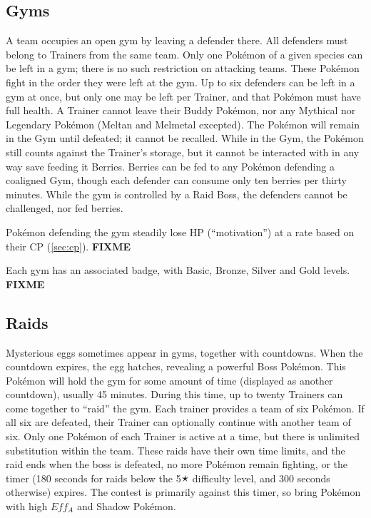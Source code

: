 \subsection{Gyms}
\label{sec:gyms}
A team occupies an open gym by leaving a defender there.
All defenders must belong to Trainers from the same team.
Only one Pokémon of a given species can be left in a gym; there is no
  such restriction on attacking teams.
These Pokémon fight in the order they were left at the gym.
Up to six defenders can be left in a gym at once, but only one
  may be left per Trainer, and that Pokémon must have full health.
A Trainer cannot leave their Buddy Pokémon, nor any Mythical nor Legendary
  Pokémon (Meltan and Melmetal excepted).
The Pokémon will remain in the Gym until defeated; it cannot be recalled.
While in the Gym, the Pokémon still counts against the Trainer's storage,
  but it cannot be interacted with in any way save feeding it Berries.
Berries can be fed to any Pokémon defending a coaligned Gym, though
  each defender can consume only ten berries per thirty minutes.
While the gym is controlled by a Raid Boss, the defenders cannot be challenged,
  nor fed berries.

Pokémon defending the gym steadily lose HP (``motivation'') at a rate
  based on their CP (\autoref{sec:cp}).
\textbf{FIXME}

Each gym has an associated badge, with Basic, Bronze, Silver and Gold levels.
\textbf{FIXME}

\subsection{Raids}
\label{sec:raids}
Mysterious eggs sometimes appear in gyms, together with countdowns.
When the countdown expires, the egg hatches, revealing a powerful Boss Pokémon.
This Pokémon will hold the gym for some amount of time (displayed as another countdown), usually 45 minutes.
During this time, up to twenty Trainers can come together to ``raid'' the gym.
Each trainer provides a team of six Pokémon.
If all six are defeated, their Trainer can optionally continue with another team of six.
Only one Pokémon of each Trainer is active at a time, but there is unlimited substitution within the team.
These raids have their own time limits, and the raid ends when the boss is defeated, no more Pokémon remain fighting,
  or the timer (180 seconds for raids below the 5🟉 difficulty level, and 300 seconds otherwise) expires.
The contest is primarily against this timer, so bring Pokémon with high $Eff_A$ and Shadow Pokémon.

